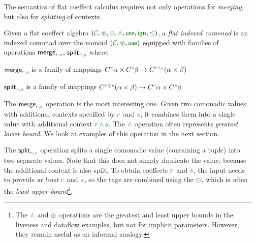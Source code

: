 The semantics of flat coeffect calculus requires not only operations for \emph{merging}, but also for
\emph{splitting} of contexts.

\begin{definition}
Given a flat coeffect algebra $(\C, \cseq, \cpar, \czip, \cunit, \czero, \cleq)$,
a \emph{flat indexed comonad} is an indexed comonad over the monoid $(\C, \cseq, \cunit)$
equipped with families of operations $\ident{merge}_{\cclrd{r},\cclrd{s}}$, $\ident{split}_{\cclrd{r},\cclrd{s}}$ where:
%
\begin{compactitem}
\item $\ident{merge}_{\cclrd{r},\cclrd{s}}$ is a family of mappings
  $\ctyp{\cclrd{r}}{\alpha} \times \ctyp{\cclrd{s}}{\beta} \rightarrow \ctyp{\cclrd{r}\czip\cclrd{s}}{(\alpha \times \beta)}$
\item $\ident{split}_{\cclrd{r},\cclrd{s}}$ is a family of mappings
  $\ctyp{\cclrd{r}\cpar\cclrd{s}}{(\alpha \times \beta)} \rightarrow \ctyp{\cclrd{r}}{\alpha} \times \ctyp{\cclrd{s}}{\beta}$
\end{compactitem}
\end{definition}

\noindent
The $\ident{merge}_{\cclrd{r},\cclrd{s}}$ operation is the most interesting one. Given two comonadic
values with additional contexts specified by $\cclrd{r}$ and $\cclrd{s}$, it combines them into a
single value with additional context $\cclrd{r}\,\czip\,\cclrd{s}$. The $\czip$ operation often represents
\emph{greatest lower bound}. We look at examples of this operation in the next section.

The $\ident{split}_{\cclrd{r},\cclrd{s}}$ operation splits a single comonadic value (containing a tuple)
into two separate values. Note that this does not simply duplicate the value, because the additional
context is also split. To obtain coeffects $\cclrd{r}$ and $\cclrd{s}$, the input needs to provide
\emph{at least} $\cclrd{r}$ and $\cclrd{s}$, so the tags are combined using the $\cpar$, which is often
the \emph{least upper-bound}\footnote{The $\czip$ and $\cpar$ operations are the greatest and least upper
bounds in the liveness and dataflow examples, but not for implicit parameters. However, they remain useful
as an informal analogy.}.

